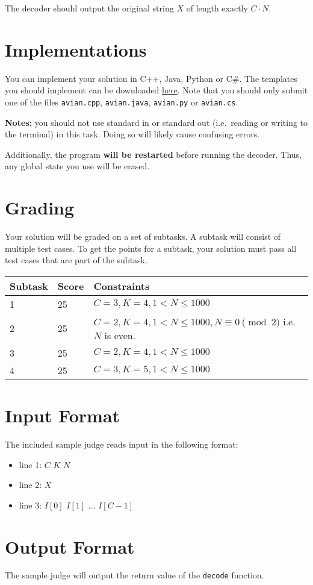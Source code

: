 The decoder should output the original string $X$ of length exactly $C \cdot N$.

\section*{Implementations}
You can implement your solution in C++, Java, Python or C\#.
The templates you should implement can be downloaded \href{http://progolymp.se/uploads/avian.zip}{here}.
Note that you should only submit one of the files \texttt{avian.cpp}, \texttt{avian.java}, \texttt{avian.py} or \texttt{avian.cs}.

\textbf{Notes:} you should not use standard in or standard out (i.e.\ reading or writing to the terminal) in this task.
Doing so will likely cause confusing errors.

Additionally, the program \textbf{will be restarted} before running the decoder.
Thus, any global state you use will be erased.

\section*{Grading}
Your solution will be graded on a set of subtasks.
A subtask will consist of multiple test cases.
To get the points for a subtask, your solution must pass all test cases that are part of the subtask.

\noindent
\begin{tabular}{| l | l | l |}
\hline
Subtask & Score & Constraints \\ \hline
1       & 25    & $C = 3, K = 4, 1 < N \le 1000$ \\ \hline
2       & 25    & $C = 2, K = 4, 1 < N \le 1000, N \equiv 0 \pmod{2}$ i.e. $N$ is even. \\ \hline
3       & 25    & $C = 2, K = 4, 1 < N \le 1000$ \\ \hline
4       & 25    & $C = 3, K = 5, 1 < N \le 1000$ \\ \hline
\end{tabular}

\section*{Input Format}
The included sample judge reads input in the following format:
\begin{itemize}
	\item line 1: $C$ $K$ $N$
	\item line 2: $X$
	\item line 3: $I[0]$ $I[1]$ $\ldots$ $I[C - 1]$
\end{itemize}

\section*{Output Format}
The sample judge will output the return value of the \texttt{decode} function.
